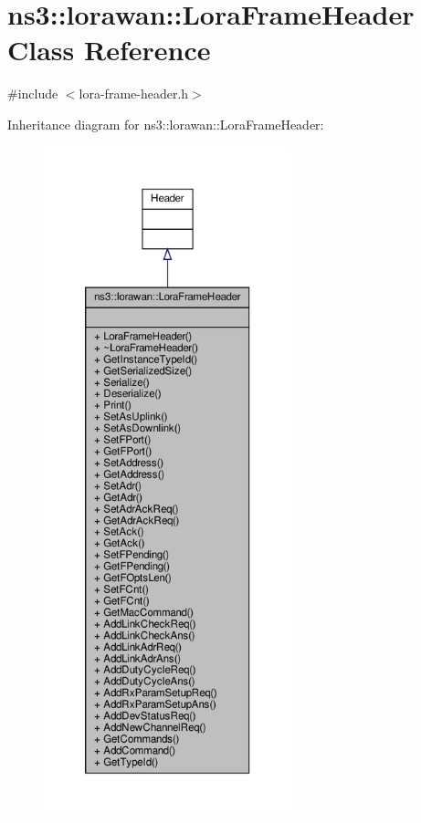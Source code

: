 \hypertarget{classns3_1_1lorawan_1_1LoraFrameHeader}{}\section{ns3\+:\+:lorawan\+:\+:Lora\+Frame\+Header Class Reference}
\label{classns3_1_1lorawan_1_1LoraFrameHeader}


{\ttfamily \#include $<$lora-\/frame-\/header.\+h$>$}



Inheritance diagram for ns3\+:\+:lorawan\+:\+:Lora\+Frame\+Header\+:
\nopagebreak
\begin{figure}[H]
\begin{center}
\leavevmode
\includegraphics[height=550pt]{classns3_1_1lorawan_1_1LoraFrameHeader__inherit__graph}
\end{center}
\end{figure}


